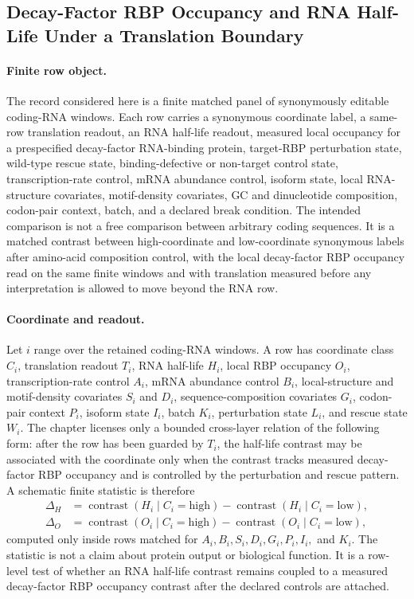 \subsection{Decay-Factor RBP Occupancy and RNA Half-Life Under a Translation Boundary}\label{sec:decay-factor-rbp-rna-half-life-translation-boundary}

\paragraph{Finite row object.}
The record considered here is a finite matched panel of synonymously editable coding-RNA windows.  Each row carries a synonymous coordinate label, a same-row translation readout, an RNA half-life readout, measured local occupancy for a prespecified decay-factor RNA-binding protein, target-RBP perturbation state, wild-type rescue state, binding-defective or non-target control state, transcription-rate control, mRNA abundance control, isoform state, local RNA-structure covariates, motif-density covariates, GC and dinucleotide composition, codon-pair context, batch, and a declared break condition.  The intended comparison is not a free comparison between arbitrary coding sequences.  It is a matched contrast between high-coordinate and low-coordinate synonymous labels after amino-acid composition control, with the local decay-factor RBP occupancy read on the same finite windows and with translation measured before any interpretation is allowed to move beyond the RNA row.

\paragraph{Coordinate and readout.}
Let $i$ range over the retained coding-RNA windows.  A row has coordinate class $C_i$, translation readout $T_i$, RNA half-life $H_i$, local RBP occupancy $O_i$, transcription-rate control $A_i$, mRNA abundance control $B_i$, local-structure and motif-density covariates $S_i$ and $D_i$, sequence-composition covariates $G_i$, codon-pair context $P_i$, isoform state $I_i$, batch $K_i$, perturbation state $L_i$, and rescue state $W_i$.  The chapter licenses only a bounded cross-layer relation of the following form: after the row has been guarded by $T_i$, the half-life contrast may be associated with the coordinate only when the contrast tracks measured decay-factor RBP occupancy and is controlled by the perturbation and rescue pattern.  A schematic finite statistic is therefore
$$
\begin{aligned}
\Delta_H &= \operatorname{contrast}(H_i \mid C_i=\mathrm{high})-\operatorname{contrast}(H_i \mid C_i=\mathrm{low}),\\
\Delta_O &= \operatorname{contrast}(O_i \mid C_i=\mathrm{high})-\operatorname{contrast}(O_i \mid C_i=\mathrm{low}),
\end{aligned}
$$
computed only inside rows matched for $A_i,B_i,S_i,D_i,G_i,P_i,I_i,$ and $K_i$.  The statistic is not a claim about protein output or biological function.  It is a row-level test of whether an RNA half-life contrast remains coupled to a measured decay-factor RBP occupancy contrast after the declared controls are attached.

